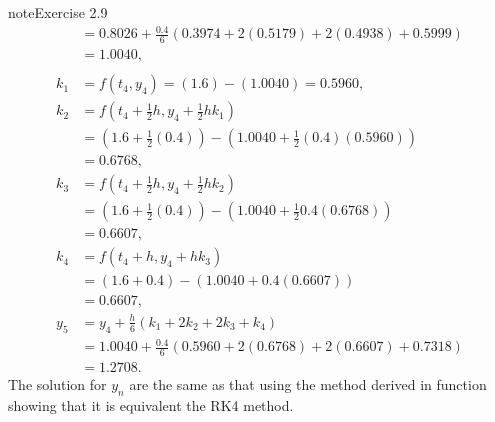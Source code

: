 \documentclass[letterpaper,10pt,english]{jupyterBook}
\begin{document}
\begin{sphinxadmonition}{note}{Exercise 2.9}
\begin{align*}
    &= 0.8026 + \frac{0.4}{6} (0.3974 + 2(0.5179) + 2(0.4938) + 0.5999) \\
    &= 1.0040, \\
    \\
    k_1 &= f(t_4, y_4) = (1.6) - (1.0040) = 0.5960, \\
    k_2 &= f(t_4 + \tfrac{1}{2}h, y_4 + \tfrac{1}{2}hk_1) \\
    &= (1.6 + \tfrac{1}{2}(0.4)) - (1.0040 + \tfrac{1}{2}(0.4)(0.5960)) \\
    &= 0.6768, \\
    k_3 &= f(t_4 + \tfrac{1}{2}h, y_4 + \tfrac{1}{2} hk_2) \\
    &= (1.6 + \tfrac{1}{2}(0.4)) - (1.0040 + \tfrac{1}{2}0.4(0.6768)) \\
    &= 0.6607, \\
    k_4 &= f(t_4 + h, y_4 + hk_3) \\
    &= (1.6 + 0.4) - (1.0040 + 0.4(0.6607)) \\
    &= 0.6607, \\
    y_5 &= y_4 + \frac{h}{6} (k_1 + 2 k_2 + 2 k_3 + k_4) \\
    &= 1.0040 + \frac{0.4}{6} (0.5960 + 2(0.6768) + 2(0.6607) + 0.7318) \\
    &= 1.2708.
\end{align*}
\sphinxAtStartPar
The solution for \(y_n\) are the same as that using the method derived in {\hyperref[\detokenize{2_ERKs/2.5_ERK_Exercises:ex2-5}]{}} function showing that it is equivalent the RK4 method.
\end{sphinxadmonition}
\end{document}
